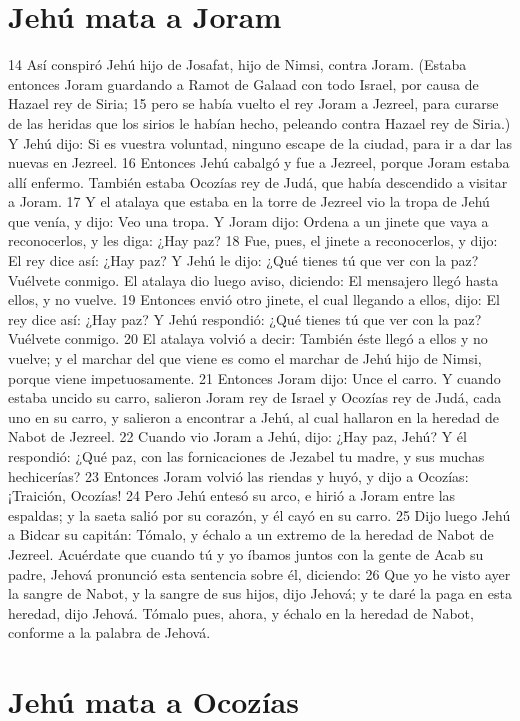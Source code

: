 \section*{Jehú mata a Joram}

14 Así conspiró Jehú hijo de Josafat, hijo de Nimsi, contra Joram. (Estaba entonces Joram guardando a Ramot de Galaad con todo Israel, por causa de Hazael rey de Siria;
15 pero se había vuelto el rey Joram a Jezreel, para curarse de las heridas que los sirios le habían hecho, peleando contra Hazael rey de Siria.) Y Jehú dijo: Si es vuestra voluntad, ninguno escape de la ciudad, para ir a dar las nuevas en Jezreel.
16 Entonces Jehú cabalgó y fue a Jezreel, porque Joram estaba allí enfermo. También estaba Ocozías rey de Judá, que había descendido a visitar a Joram.
17 Y el atalaya que estaba en la torre de Jezreel vio la tropa de Jehú que venía, y dijo: Veo una tropa. Y Joram dijo: Ordena a un jinete que vaya a reconocerlos, y les diga: ¿Hay paz?
18 Fue, pues, el jinete a reconocerlos, y dijo: El rey dice así: ¿Hay paz? Y Jehú le dijo: ¿Qué tienes tú que ver con la paz? Vuélvete conmigo. El atalaya dio luego aviso, diciendo: El mensajero llegó hasta ellos, y no vuelve.
19 Entonces envió otro jinete, el cual llegando a ellos, dijo: El rey dice así: ¿Hay paz? Y Jehú respondió: ¿Qué tienes tú que ver con la paz? Vuélvete conmigo.
20 El atalaya volvió a decir: También éste llegó a ellos y no vuelve; y el marchar del que viene es como el marchar de Jehú hijo de Nimsi, porque viene impetuosamente.
21 Entonces Joram dijo: Unce el carro. Y cuando estaba uncido su carro, salieron Joram rey de Israel y Ocozías rey de Judá, cada uno en su carro, y salieron a encontrar a Jehú, al cual hallaron en la heredad de Nabot de Jezreel.
22 Cuando vio Joram a Jehú, dijo: ¿Hay paz, Jehú? Y él respondió: ¿Qué paz, con las fornicaciones de Jezabel tu madre, y sus muchas hechicerías?
23 Entonces Joram volvió las riendas y huyó, y dijo a Ocozías: ¡Traición, Ocozías!
24 Pero Jehú entesó su arco, e hirió a Joram entre las espaldas; y la saeta salió por su corazón, y él cayó en su carro.
25 Dijo luego Jehú a Bidcar su capitán: Tómalo, y échalo a un extremo de la heredad de Nabot de Jezreel. Acuérdate que cuando tú y yo íbamos juntos con la gente de Acab su padre, Jehová pronunció esta sentencia sobre él, diciendo:
26 Que yo he visto ayer la sangre de Nabot, y la sangre de sus hijos, dijo Jehová; y te daré la paga en esta heredad, dijo Jehová. Tómalo pues, ahora, y échalo en la heredad de Nabot, conforme a la palabra de Jehová.
\section*{Jehú mata a Ocozías }

